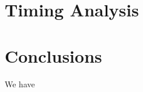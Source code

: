 \documentclass[preprint,review,12pt]{elsarticle}
\begin{document}
\iffalse
\begin{figure}
\centering
	\begin{subfigure}[b]{0.49\textwidth}
		\centering
		\texttt{[image: figures/SI\_MIP\_hex\_C=1\_PWLD\_LS\_wNSR.eps]}
	\end{subfigure}
	\hfill
	\begin{subfigure}[b]{0.49\textwidth}
		\centering
		\texttt{[image: figures/SI\_MIP\_hex\_C=4\_PWLD\_LS\_wNSR.eps]}
	\end{subfigure}
\caption{Comparison between the numerical spectral radii and the theoretical Fourier Analysis spectral radii on the unit cube with $c=1$ (top) and $c=4$ (bottom).}
\label{fig::DSA_3D1G_Fourier_NSR}
\end{figure}
\fi
\section{Timing Analysis} \label{sec::timing}


\section{Conclusions} \label{sec::conclusions}

We have 

\pagebreak



\end{document}
